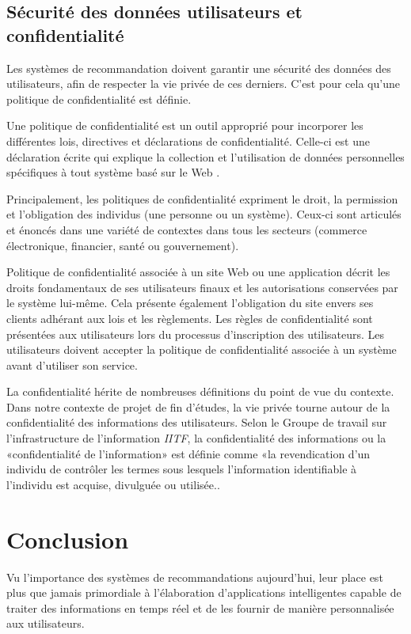 \subsection{Sécurité des données utilisateurs et confidentialité}
Les systèmes de recommandation doivent garantir une sécurité des données des utilisateurs, afin de respecter la vie privée de ces derniers. C'est pour cela qu'une politique de confidentialité est définie. 

Une politique de confidentialité est un outil approprié pour incorporer les différentes lois, directives et déclarations de confidentialité. Celle-ci est une déclaration écrite qui explique la collection et l'utilisation de données personnelles spécifiques à tout système basé sur le Web \cite{Awad}.

Principalement, les politiques de confidentialité expriment le droit, la permission et l'obligation des individus (une personne ou un système). Ceux-ci sont articulés et énoncés dans une variété de contextes dans tous les secteurs (commerce électronique, financier, santé ou gouvernement). 

Politique de confidentialité associée à un site Web ou une application décrit les droits fondamentaux de ses utilisateurs finaux et les autorisations conservées par le système lui-même. Cela présente également l'obligation du site envers ses clients adhérant aux lois et les règlements. Les règles de confidentialité sont présentées aux utilisateurs lors du processus d'inscription des utilisateurs. Les utilisateurs doivent accepter la politique de confidentialité associée à un système avant d'utiliser son service.

La confidentialité hérite de nombreuses définitions du point de vue du contexte. Dans notre contexte de projet de fin d'études, la vie privée tourne autour de la confidentialité des informations des utilisateurs. Selon le Groupe de travail sur l'infrastructure de l'information \emph{IITF}, \textquotedbl la confidentialité des informations ou la «confidentialité de l'information» est définie comme «la revendication d'un individu de contrôler les termes sous lesquels l'information identifiable à l'individu est acquise, divulguée ou utilisée.\textquotedbl \cite {IITF}.

\section{Conclusion}
Vu l'importance des systèmes de recommandations aujourd'hui, leur place est plus que jamais primordiale à l'élaboration d'applications intelligentes capable de traiter des informations en temps réel et de les fournir de manière personnalisée aux utilisateurs.

